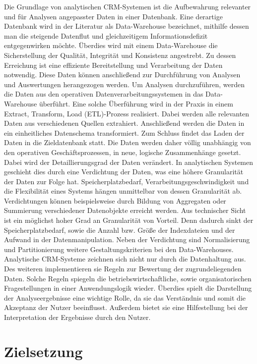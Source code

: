 Die Grundlage von analytischen CRM-Systemen ist die Aufbewahrung relevanter und für Analysen angepasster Daten in einer Datenbank. Eine derartige Datenbank wird in der Literatur als Data-Warehouse bezeichnet, mithilfe dessen man die steigende Datenflut und gleichzeitigem Informationsdefizit entgegenwirken möchte. Überdies wird mit einem Data-Warehouse die Sicherstellung der Qualität, Integrität und Konsistenz angestrebt. Zu dessen Erreichung ist eine effiziente Bereitstellung und Verarbeitung der Daten notwendig. Diese Daten können anschließend zur Durchführung von Analysen und Auswertungen herangezogen werden. Um Analysen durchzuführen, werden die Daten aus den operativen Datenverarbeitungssystemen in das Data-Warehouse überführt. Eine solche Überführung wird in der Praxis in einem Extract, Transform, Load (ETL)-Prozess realisiert. Dabei werden alle relevanten Daten aus verschiedenen Quellen extrahiert. Anschließend werden die Daten in ein einheitliches Datenschema transformiert. Zum Schluss findet das Laden der Daten in die Zieldatenbank statt. 
Die Daten werden daher völlig unabhängig von den operativen Geschäftsprozessen, in neue, logische Zusammenhänge gesetzt. Dabei wird der Detaillierungsgrad der Daten verändert. In analytischen Systemen geschieht dies durch eine Verdichtung der Daten, was eine höhere Granularität der Daten zur Folge hat. Speicherplatzbedarf,  Verarbeitungsgeschwindigkeit und die Flexibilität eines Systems hängen unmittelbar von dessen Granularität ab. Verdichtungen können beispielsweise durch Bildung von Aggregaten oder Summierung verschiedener Datenobjekte erreicht werden. Aus technischer Sicht ist ein möglichst hoher Grad an Granularität von Vorteil. Denn dadurch sinkt der Speicherplatzbedarf, sowie die Anzahl bzw. Größe der Indexdateien und der Aufwand in der Datenmanipulation. Neben der Verdichtung sind Normalisierung und Partitionierung weitere Gestaltungskriterien bei den Data-Warehouses. Analytische CRM-Systeme zeichnen sich nicht nur durch die Datenhaltung aus. Des weiteren implementieren sie Regeln zur Bewertung der zugrundeliegenden Daten. Solche Regeln spiegeln die betriebswirtschaftliche, sowie organisatorischen Fragestellungen in einer Anwendungslogik wieder. Überdies spielt die Darstellung der Analyseergebnisse eine wichtige Rolle, da sie das Verständnis und somit die Akzeptanz der Nutzer beeinflusst. Außerdem bietet sie eine Hilfestellung bei der Interpretation der Ergebnisse durch den Nutzer.

\section{Zielsetzung}
\label{ch:Einfuehrung:sec:Zielsetzung}

